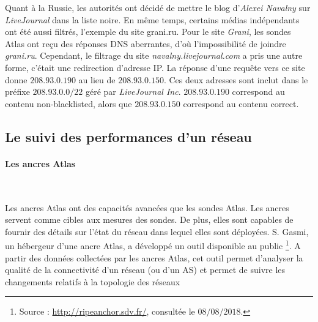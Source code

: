 Quant à la Russie, les autorités ont décidé de mettre le blog d'\textit{Alexei Navalny} sur  \textit{LiveJournal}  dans la liste noire. En même temps, certains médias indépendants ont été aussi filtrés, l'exemple du site grani.ru.  Pour le site  \textit{Grani}, les sondes Atlas ont reçu des réponses DNS aberrantes, d'où l'impossibilité de joindre   \textit{grani.ru}. Cependant, le filtrage du site \textit{navalny.livejournal.com}  a pris une autre forme, c'était une redirection d'adresse IP. La réponse d'une requête vers ce site donne $208.93.0.190$  au lieu de $ 208.93.0.150$. Ces deux adresses sont inclut dans le préfixe $208.93.0.0/22$ géré par \textit{LiveJournal Inc}. 
$208.93.0.190$  correspond au contenu  non-blacklisted, alors que  $ 208.93.0.150$ correspond au contenu correct.


\subsection{Le suivi des performances d'un réseau}


\paragraph{Les ancres  Atlas}~

Les ancres  Atlas ont des capacités avancées que les sondes  Atlas. Les ancres servent comme cibles aux mesures des sondes. De plus, elles sont capables de fournir des détails sur l'état du réseau dans lequel elles sont déployées.  S. Gasmi, un hébergeur d'une ancre  Atlas, a développé un outil  disponible au public \footnote{Source : \url{http://ripeanchor.sdv.fr/}, consultée le $08/08/2018$.}. 
A partir des données collectées par les ancres Atlas, cet outil permet d'analyser  la qualité de la connectivité d'un réseau (ou d'un AS) et permet de suivre les changements relatifs à la topologie des réseaux

